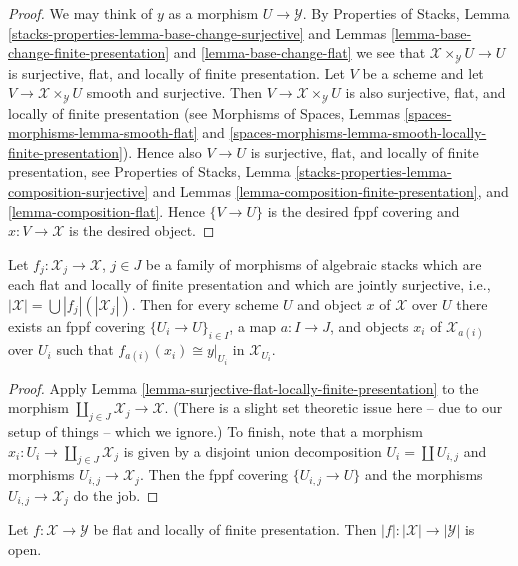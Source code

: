 \begin{proof}
We may think of $y$ as a morphism $U \to \mathcal{Y}$. By
Properties of Stacks, Lemma
\ref{stacks-properties-lemma-base-change-surjective}
and
Lemmas \ref{lemma-base-change-finite-presentation} and
\ref{lemma-base-change-flat}
we see that $\mathcal{X} \times_\mathcal{Y} U \to U$ is surjective, flat,
and locally of finite presentation. Let $V$ be a scheme and let
$V \to \mathcal{X} \times_\mathcal{Y} U$ smooth and surjective.
Then $V \to \mathcal{X} \times_\mathcal{Y} U$ is also surjective, flat, and
locally of finite presentation (see
Morphisms of Spaces, Lemmas
\ref{spaces-morphisms-lemma-smooth-flat} and
\ref{spaces-morphisms-lemma-smooth-locally-finite-presentation}).
Hence also $V \to U$ is surjective, flat, and
locally of finite presentation, see
Properties of Stacks, Lemma
\ref{stacks-properties-lemma-composition-surjective}
and
Lemmas \ref{lemma-composition-finite-presentation}, and
\ref{lemma-composition-flat}.
Hence $\{V \to U\}$ is the desired fppf covering and $x : V \to \mathcal{X}$
is the desired object.
\end{proof}

\begin{lemma}
\label{lemma-surjective-family-flat-locally-finite-presentation}
Let $f_j : \mathcal{X}_j \to \mathcal{X}$, $j \in J$ be a family of morphisms
of algebraic stacks which are each flat and locally of finite presentation
and which are jointly surjective, i.e.,
$|\mathcal{X}| = \bigcup |f_j|(|\mathcal{X}_j|)$.
Then for every scheme $U$ and object $x$ of $\mathcal{X}$ over $U$
there exists an fppf covering $\{U_i \to U\}_{i \in I}$, a map
$a : I \to J$, and objects $x_i$ of $\mathcal{X}_{a(i)}$ over $U_i$
such that $f_{a(i)}(x_i) \cong y|_{U_i}$ in $\mathcal{X}_{U_i}$.
\end{lemma}

\begin{proof}
Apply
Lemma \ref{lemma-surjective-flat-locally-finite-presentation}
to the morphism $\coprod_{j \in J} \mathcal{X}_j \to \mathcal{X}$.
(There is a slight set theoretic issue here -- due to our setup of
things -- which we ignore.) To finish, note that a morphism
$x_i : U_i \to \coprod_{j \in J} \mathcal{X}_j$ is given by a
disjoint union decomposition $U_i = \coprod U_{i, j}$ and morphisms
$U_{i, j} \to \mathcal{X}_j$. Then the fppf covering $\{U_{i, j} \to U\}$
and the morphisms $U_{i, j} \to \mathcal{X}_j$ do the job.
\end{proof}

\begin{lemma}
\label{lemma-fppf-open}
Let $f : \mathcal{X} \to \mathcal{Y}$ be flat and locally of finite
presentation. Then $|f| : |\mathcal{X}| \to |\mathcal{Y}|$ is open.
\end{lemma}

